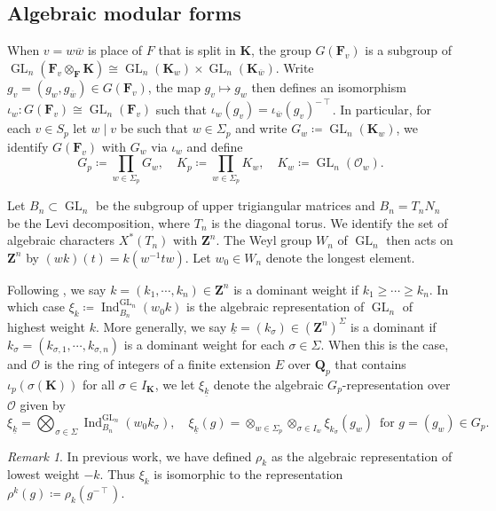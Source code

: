 \documentclass[leqno]{amsart}
\theoremstyle{definition}
\theoremstyle{remark}
\newtheorem{rem}[thm]{Remark}
\newcommand{\oo}{\mathcal{O}}
\newcommand{\Z}{{\mathbf{Z}}}
\newcommand{\Qp}{\mathbf{Q}_p}
\DeclareMathOperator{\Ind}{Ind}
\DeclareMathOperator{\GL}{GL}
\newcommand{\F}{{\mathbf{F}}} %
\newcommand{\K}{{\mathbf{K}}} %
\newcommand{\bw}{\overline{w}}
\newcommand{\wt}[1]{\underline{ #1 }}
\begin{document}
\subsection{Algebraic modular forms}

When $v=w\bw$ is place of $F$ that is split in $\K$,
the group $G(\F_v)$ is a subgroup 
of  $\GL_n(\F_v\otimes_\F\K)\cong \GL_n(\K_w)\times\GL_n(\K_{\bw})$.
Write $g_v=(g_w,g_{\bw})\in G(\F_v)$,
the map $g_v\mapsto g_w$ then defines an isomorphism
$\iota_w\colon G(\F_v)\cong \GL_n(\F_v)$
such that 
$\iota_w(g_v)=\iota_{\bw}(g_v)^{-\intercal}$.
In particular,
for each $v\in S_p$
let  $w\mid v$ be such that  $w\in \Sigma_p$
and write $G_{w}\coloneqq\GL_n(\K_w)$,
we identify $G(\F_v)$ with $G_w$ 
via $\iota_w$ and define 
\[
	G_p\coloneqq\prod_{w\in \Sigma_p}G_w,\quad
	K_p\coloneqq\prod_{w\in \Sigma_p}K_w,\quad
	K_w\coloneqq\GL_n(\oo_w).
\]

Let $B_n\subset \GL_n$ be the subgroup of
upper trigiangular matrices
and $B_n=T_nN_n$ be the Levi decomposition,
where $T_n$ is the diagonal torus.
We identify the set of algebraic characters $X^*(T_n)$
with  $\Z^n$.
The Weyl group $W_n$ of $\GL_n$
then acts on  $\Z^n$ by
$(wk)(t)=k(w^{-1}tw)$.
Let $w_0\in W_n$ denote the longest element.

Following \cite[Def 2.3]{ger},
we say  $k=(k_1,\cdots,k_n)\in \Z^n$
is a dominant weight if $k_1\geq \cdots\geq k_n$.
In which case
$\xi_k\coloneqq \Ind_{B_n}^{\GL_n}(w_0k)$
is the algebraic representation 
of $\GL_n$ of highest weight $k$.
More generally,
we say $\wt{k}=(k_\sigma)\in (\Z^n)^{\Sigma}$
is a dominant 
if $k_\sigma=(k_{\sigma,1},\cdots,k_{\sigma,n})$
is a dominant weight for each $\sigma\in \Sigma$.
When this is the case,
and $\oo$ is the ring of integers  
of a finite extension $E$ over  $\Qp$
that contains $\iota_p(\sigma(\K))$
for all  $\sigma\in I_\K$,
we let $\xi_{\wt{k}}$ denote 
the algebraic $G_p$-representation over $\oo$ given by
\begin{equation}\label{def:algrep}
	\xi_{\wt{k}}=\bigotimes_{\sigma\in \Sigma}
	\Ind_{B_n}^{\GL_n}(w_0k_{\sigma}),\quad
	\xi_{\wt{k}}(g)=
	\otimes_{w\in \Sigma_p}
	\otimes_{\sigma\in I_w}\xi_{k_\sigma}(g_w)\,
	\text{ for } g=(g_w)\in G_p.
\end{equation}

\begin{rem}
	In previous work, 
	we have defined $\rho_k$ as the 
	algebraic representation of lowest weight  $-k$.
	Thus $\xi_k$ is isomorphic to the representation 
	$\rho^k(g)\coloneqq \rho_k(g^{-\intercal})$.
\end{rem}
\end{document}
